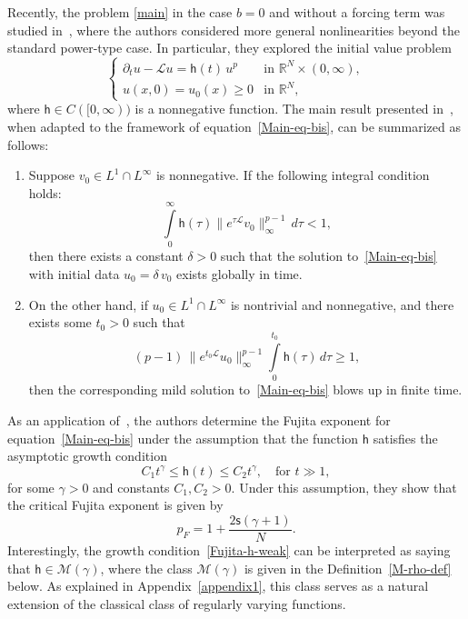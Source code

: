 \documentclass[12pt,reqno]{amsart}
\theoremstyle{plain}
\theoremstyle{definition}
\theoremstyle{remark}
\numberwithin{equation}{section}
\newcommand{\sL}{\mathscr{L}}
\newcommand{\h}{\mathsf h}
\newcommand{\ts}{\mathsf{s}}
\begin{document}
Recently, the problem \eqref{main} in the case $ b = 0 $ and without a forcing term was studied in~\cite{Migu-2025}, where the authors considered more general nonlinearities beyond the standard power-type case. In particular, they explored the initial value problem
\begin{equation}
\begin{cases} 
\label{Main-eq-bis}   
\partial_t u - \mathscr{L} u = \h(t)\, u^p & \text{in } \mathbb{R}^N \times (0,\infty), \\ 
u(x,0) = u_0(x) \geq 0 & \text{in } \mathbb{R}^N,
\end{cases}
\end{equation}
where $\h \in C([0,\infty)) $ is a nonnegative function. 
The main result presented in~\cite[Theorem 6]{Migu-2025}, when adapted to the framework of equation~\eqref{Main-eq-bis}, can be summarized as follows:
\begin{enumerate}
    \item[$\varoast$] Suppose $v_0 \in L^1 \cap L^\infty$ is nonnegative. If the following integral condition holds:
    \begin{equation}
        \label{Glob-cond}
        \int\limits_0^\infty \h(\tau) \|e^{\tau \sL} v_0\|_\infty^{p-1} \, d\tau < 1,
    \end{equation}
    then there exists a constant $\delta > 0$ such that the solution to~\eqref{Main-eq-bis} with initial data $u_0 = \delta\,v_0$ exists globally in time.
    \item[$\varoast$] On the other hand, if $u_0 \in L^1 \cap L^\infty$ is nontrivial and nonnegative, and there exists some $t_0 > 0$ such that
    \begin{equation}
        \label{Blow-cond}
        (p-1)\, \|e^{t_0 \sL} u_0\|_\infty^{p-1} \int\limits_0^{t_0} \h(\tau)\, d\tau \geq  1,
    \end{equation}
    then the corresponding mild solution to~\eqref{Main-eq-bis} blows up in finite time.
\end{enumerate}

As an application of~\cite[Theorem 6]{Migu-2025}, the authors determine the Fujita exponent for equation~\eqref{Main-eq-bis} under the assumption that the function $\h$ satisfies the asymptotic growth condition
\begin{equation}
    \label{Fujita-h-weak}
    C_1 t^\gamma \leq \h(t) \leq C_2 t^\gamma, \quad \text{for } t \gg 1,
\end{equation}
for some $\gamma > 0$ and constants $C_1, C_2 > 0$. Under this assumption, they show that the critical Fujita exponent is given by
\begin{equation}
    \label{Fujita-rho-weak}
    p_F = 1 + \frac{2\ts(\gamma + 1)}{N}.
\end{equation}
Interestingly, the growth condition~\eqref{Fujita-h-weak} can be interpreted as saying that $\h \in \mathcal{M}(\gamma)$, where the class $\mathcal{M}(\gamma)$ is given in the Definition~\ref{M-rho-def} below. As explained in Appendix~\ref{appendix1}, this class serves as a natural extension of the classical class of regularly varying functions. 
\end{document}
